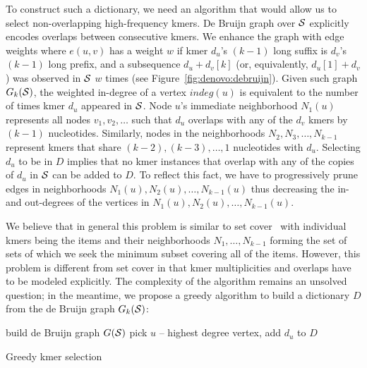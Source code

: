 \documentclass[12pt]{cmuthesis}
\begin{document}
  To construct such a dictionary, we need an algorithm that would allow us to select non-overlapping high-frequency kmers. De Bruijn graph over $\mathcal{S}$ explicitly encodes overlaps between consecutive kmers. We enhance the graph with edge weights where $e(u,v)$ has a weight $w$ if kmer $d_u$'s $(k-1)$ long suffix is $d_v$'s $(k-1)$ long prefix, and a subsequence $d_u + d_v[k]$ (or, equivalently, $d_u[1] + d_v$) was observed in $\mathcal{S}$ $w$ times (see Figure~\ref{fig:denovo:debruijn}). Given such graph $G_k(\mathcal{S})$, the weighted in-degree of a vertex $indeg(u)$ is equivalent to the number of times kmer $d_u$ appeared in $\mathcal{S}$. Node $u$'s immediate neighborhood $N_1(u)$ represents all nodes $v_1, v_2, \ldots$ such that $d_u$ overlaps with any of the $d_v$ kmers by $(k-1)$ nucleotides. Similarly, nodes in the neighborhoods $N_2, N_3, \ldots, N_{k-1}$ represent kmers that share $(k-2), (k-3), \ldots, 1$ nucleotides with $d_u$. Selecting $d_u$ to be in $D$ implies that no kmer instances that overlap with any of the copies of $d_u$ in $\mathcal{S}$ can be added to $D$. To reflect this fact, we have to progressively prune edges in neighborhoods $N_1(u), N_2(u), \ldots, N_{k-1}(u)$ thus decreasing the in- and out-degrees of the vertices in $N_1(u), N_2(u), \ldots, N_{k-1}(u)$. 


  We believe that in general this problem is similar to set cover~\cite{SetCoverIsHard} with individual kmers being the items and their neighborhoods $N_1, \ldots, N_{k-1}$ forming the set of sets of which we seek the minimum subset covering all of the items. However, this problem is different from set cover in that kmer multiplicities and overlaps have to be modeled explicitly. The complexity of the algorithm remains an unsolved question; in the meantime, we propose a greedy algorithm to build a dictionary $D$ from the de Bruijn graph $G_k(\mathcal{S})$:
  
  \begin{algorithm}[H]
   build de Bruijn graph $G(\mathcal{S})$\;
   pick $u$ -- highest degree vertex, add $d_u$ to $D$\;
   \caption{Greedy kmer selection}
   \label{algo:greedy}
  \end{algorithm}
\end{document}
